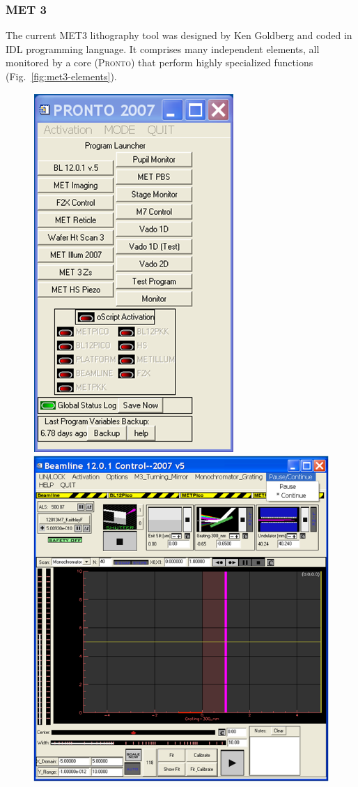 \documentclass[10pt,letter,twoside]{report}
\begin{document}
			\subsubsection{MET 3}
			The current MET3 lithography tool was designed by Ken Goldberg and coded in \textsc{IDL} programming language. 
			It comprises many independent elements, all monitored by a core (\textsc{Pronto})			
			that perform highly specialized functions (Fig.~\ref{fig:met3-elements}).
			\begin{figure}[ht]
			\centerline{\includegraphics[scale=0.5]{img/met3-pronto.png}
			\includegraphics[scale=0.5]{img/met3-beamline.png}
}
\end{figure}
\end{document}
